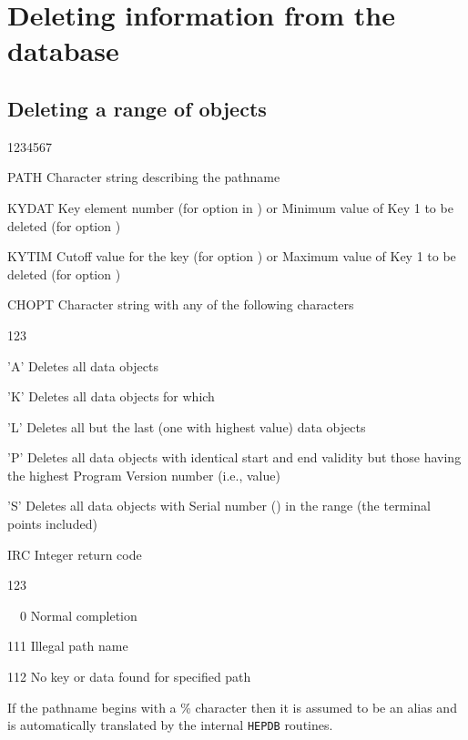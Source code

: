 \section{Deleting information from the database}

\subsection{Deleting a range of objects}


\begin{DLtt}{1234567}
\item[PATH]Character string describing the pathname
\item[KYDAT]Key element number (for option  in ) or
  Minimum value of Key 1 to be deleted (for option )
\item[KYTIM]Cutoff value for the key (for option ) or
  Maximum value of Key 1 to be deleted (for option )
\item[CHOPT]Character string with any of the following characters
  \begin{DLtt}{123}
    \item['A']Deletes all data objects
    \item['K']Deletes all data objects for which 
    \item['L']Deletes all but the last (one with highest  value)
      data objects
    \item['P']Deletes all data objects with identical start and end
      validity but those having the highest Program Version
      number (i.e.,  value)
    \item['S']Deletes all data objects with Serial number () in
      the range  (the terminal points included)
  \end{DLtt}
\item[IRC]Integer return code
  \begin{DLtt}{123}
    \item[\ \ 0]Normal completion
    \item[111]Illegal path name
    \item[112]No key or data found for specified path
  \end{DLtt}
\end{DLtt}

If the pathname begins with a \% character then it is assumed to be
an alias and is automatically translated by the internal {\tt HEPDB}
routines.

